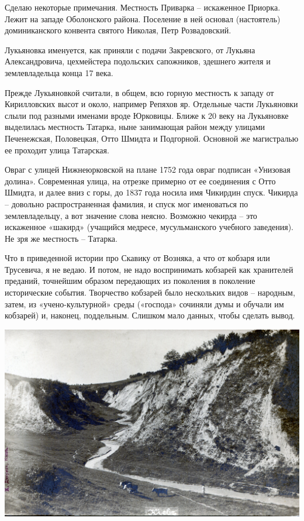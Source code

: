 Сделаю некоторые примечания. Местность Приварка – искаженное Приорка. Лежит на западе Оболонского района. Поселение в ней основал (настоятель) доминиканского конвента святого Николая, Петр Розвадовский. 

Лукьяновка именуется, как приняли с подачи Закревского, от Лукьяна Александровича, цехмейстера подольских сапожников, здешнего жителя и землевладельца конца 17 века.

Прежде Лукьяновкой считали, в общем, всю горную местность к западу от Кирилловских высот и около, например Репяхов яр. Отдельные части Лукьяновки слыли под разными именами вроде Юрковицы. Ближе к 20 веку на Лукьяновке выделилась местность Татарка, ныне занимающая район между улицами Печенежская, Половецкая, Отто Шмидта и Подгорной. Основной же магистралью ее проходит улица Татарская.

Овраг с улицей Нижнеюрковской на плане 1752 года овраг подписан «Унизовая долина». Современная улица, на отрезке примерно от ее соединения с Отто Шмидта, и далее вниз с горы, до 1837 года носила имя Чикирдин спуск. Чикирда – довольно распространенная фамилия, и спуск мог именоваться по землевладельцу, а вот значение слова неясно. Возможно чекирда – это искаженное «шакирд» (учащийся медресе, мусульманского учебного заведения). Не зря же местность – Татарка.

Что в приведенной истории про Скавику от Возняка, а что от кобзаря или Трусевича, я не ведаю. И потом, не надо воспринимать кобзарей как хранителей преданий, точнейшим образом передающих из поколения в поколение исторические события. Творчество кобзарей было нескольких видов – народным, затем, из «учено-культурной» среды («господа» сочиняли думы и обучали им кобзарей) и, наконец, поддельным. Слишком мало данных, чтобы сделать вывод.

\newpage
\vspace*{\fill}
\begin{center}
\includegraphics[width=\linewidth]{chast-colebanie-osnov/sheka/lukold01.jpg}
\end{center}

